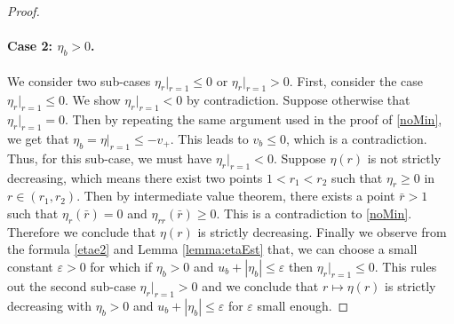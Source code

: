 \documentclass[a4paper,12pt,draft]{article}
\theoremstyle{remark}
\def\ep{\varepsilon}
\begin{document}
\begin{proof}
    \paragraph{\bf Case 2: $\eta_b> 0$.} We consider two sub-cases $\eta_r\vert_{r=1}\le 0$ or $\eta_r \vert_{r=1}>0$. %
First, consider the case $\eta_r\vert_{r=1}\le 0$. We show $\eta_r \vert_{r=1}<0$ by contradiction. Suppose otherwise that $\eta_r \vert_{r=1} =0$. Then by repeating the same argument used in the proof of \eqref{noMin}, we get that $\eta_b=\eta\vert_{r=1}\le -v_{+}$. This leads to $v_b\le 0$, which is a contradiction. Thus, for this sub-case, we must have $\eta_r \vert_{r=1} < 0$. Suppose $\eta(r)$ is not strictly decreasing, which means there exist two points $1 < r_1 < r_2 $ such that $\eta_r \ge 0$ in $r\in (r_1,r_2)$. Then by intermediate value theorem, there exists a point $\bar{r}>1$ such that $\eta_r(\bar{r})=0$ and $\eta_{rr}(\bar{r})\ge 0$. This is a contradiction to \eqref{noMin}. Therefore we conclude that $\eta(r)$ is strictly decreasing. Finally we observe from the formula \eqref{etae2} and Lemma \ref{lemma:etaEst} that, we can choose a small constant $\ep>0$ for which if $\eta_b> 0$ and $u_b+|\eta_b|\le \ep$ then $\eta_r \vert_{r=1} \le 0$. This rules out the second sub-case $\eta_r \vert_{r=1}>0$ and we conclude that $r\mapsto \eta(r)$ is strictly decreasing with $\eta_b> 0$ and $u_b+|\eta_b|\le \ep$ for $\ep$ small enough. 
\end{proof}
\end{document}
